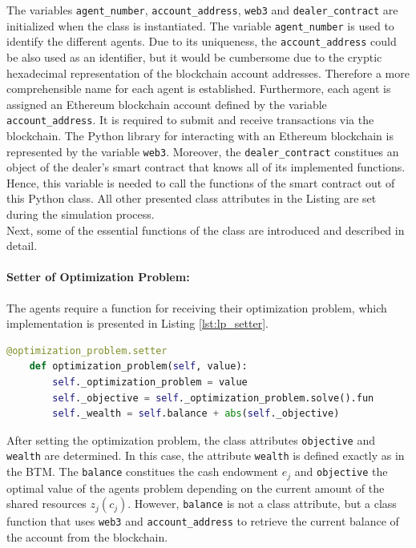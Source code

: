 The variables \verb|agent_number|, \verb|account_address|, \verb|web3| and \verb|dealer_contract| are initialized when the class is instantiated.
The variable \verb|agent_number| is used to identify the different agents.
Due to its uniqueness, the \verb|account_address| could be also used as an identifier, 
but it would be cumbersome due to the cryptic hexadecimal representation of the blockchain account addresses.
Therefore a more comprehensible name for each agent is established.
Furthermore, each agent is assigned an Ethereum blockchain account defined by the variable \verb|account_address|. It is required to submit and 
receive transactions via the blockchain.
The Python library for interacting with an Ethereum blockchain is represented by the variable \verb|web3|.
Moreover, the \verb|dealer_contract| constitues an object of the dealer's smart contract that knows all of its implemented functions.
Hence, this variable is needed to call the functions of the smart contract out of this Python class.
All other presented class attributes in the Listing are set during the simulation process.\\

Next, some of the essential functions of the class are introduced and described in detail.

\paragraph{Setter of Optimization Problem:} The agents require a function for receiving their optimization problem, which 
implementation is presented in Listing \ref{lst:lp_setter}.

\begin{lstlisting}[label=lst:lp_setter, caption=Setter of Optimization Problem, language=Python]
    @optimization_problem.setter
    def optimization_problem(self, value):
        self._optimization_problem = value
        self._objective = self._optimization_problem.solve().fun
        self._wealth = self.balance + abs(self._objective)
\end{lstlisting}

After setting the optimization problem, the class attributes \verb|objective| and \verb|wealth| are determined.
In this case, the attribute \verb|wealth| is defined exactly as in the BTM. 
The \verb|balance| constitues the cash endowment $e_{j}$ and \verb|objective| the optimal value of the agents
problem depending on the current amount of the shared resources $z_{j}(c_{j})$.
However, \verb|balance| is not a class attribute, but a class function that uses 
\verb|web3| and \verb|account_address| to retrieve the current
balance of the account from the blockchain.

